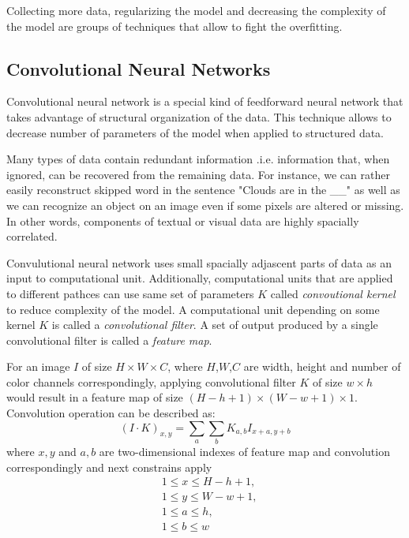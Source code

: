 Collecting more data, regularizing the model and decreasing the complexity of the model are groups of techniques that allow to fight the overfitting.




\subsection{Convolutional Neural Networks}
\label{ch:cnn}

Convolutional neural network is a special kind of feedforward neural network that takes advantage of structural organization of the data. This technique allows to decrease number of parameters of the model when applied to structured data.

Many types of data contain redundant information .i.e. information that, when ignored, can be recovered from the remaining data.
For instance, we can rather easily reconstruct skipped word in the sentence "Clouds are in the \_\_" as well as we can recognize an object on an image even if some pixels are altered or missing.
In other words, components of textual or visual data are highly spacially correlated.

Convulutional neural network uses small spacially adjascent parts of data as an input to computational unit. Additionally, computational units that are applied to different pathces can use same set of parameters $K$ called \textit{convoutional kernel} to reduce complexity of the model. A computational unit depending on some kernel $K$ is called a \textit{convolutional filter}. A set of output produced by a single convolutional filter is called a \textit{feature map}.



For an image $I$ of size $H \times W \times C$, where $H$,$W$,$C$ are width, height and number of color channels correspondingly, applying convolutional filter $K$ of size $w \times h$ would result in a feature map of size $(H-h+1) \times (W-w+1) \times 1$. Convolution operation can be described as:
\begin{equation}\label{eq:conv}
  (I \cdot K)_{x, y} = \sum_a \sum_b K_{a,b} I_{x+a, y+b}
\end{equation}
where ${x, y}$ and ${a,b}$ are two-dimensional indexes of feature map and convolution correspondingly and next constrains apply
\begin{equation*}
  \begin{aligned}
  &1 \leq  x \leq H-h+1, \\
  &1 \leq  y \leq W-w+1, \\
  &1 \leq  a \leq h, \\
  &1 \leq  b \leq w
\end{aligned}
\end{equation*}

